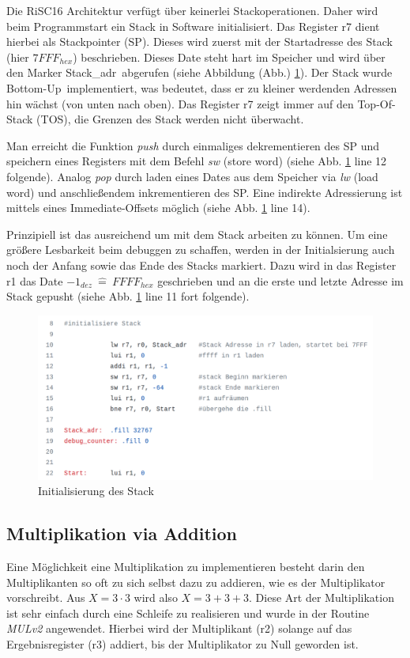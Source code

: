 \documentclass[fleqn, a4paper, 11pt]{article}       %
\begin{document}
Die RiSC16 Architektur verfügt über keinerlei Stackoperationen. Daher wird beim Programmstart ein Stack in Software initialisiert. Das Register r7 dient hierbei als Stackpointer (SP). Dieses wird zuerst mit der Startadresse des Stack (hier $7FFF_{hex}$) beschrieben. Dieses Date steht hart im Speicher und wird über den Marker \glqq Stack\_adr\grqq \ abgerufen (siehe  Abbildung (Abb.) \ref{fig:Stack}).
Der Stack wurde  \glqq Bottom-Up\grqq \ implementiert, was bedeutet, dass er zu kleiner werdenden Adressen hin wächst (von unten nach oben). Das Register r7 zeigt immer auf den Top-Of-Stack (TOS), die Grenzen des Stack werden nicht überwacht.

Man erreicht die Funktion \emph{push}  durch einmaliges dekrementieren des SP und speichern eines Registers mit dem Befehl \emph{sw} (store word) (siehe Abb. \ref{fig:Stack} line 12 folgende). Analog \emph{pop} durch laden eines Dates aus dem Speicher via \emph{lw} (load word) und anschließendem inkrementieren des SP. Eine indirekte Adressierung ist mittels eines Immediate-Offsets möglich (siehe Abb. \ref{fig:Stack} line 14).

Prinzipiell ist das ausreichend um mit dem Stack arbeiten zu können. Um eine größere Lesbarkeit beim debuggen zu schaffen, werden in der Initialsierung auch noch der Anfang sowie das Ende des Stacks markiert. Dazu wird in das Register r1 das Date $-1_{dez}\ \widehat{=}\ FFFF_{hex}$ geschrieben und an die erste und letzte Adresse im Stack gepusht (siehe Abb. \ref{fig:Stack} line 11 fort folgende).

\begin{figure}[h]
    \includegraphics[width =1\textwidth]{Stack_init.png}
\caption{Initialisierung des Stack}
\label{fig:Stack}
\end{figure}



\subsection{Multiplikation via Addition}
Eine Möglichkeit eine Multiplikation zu implementieren besteht darin den Multiplikanten so oft zu sich selbst dazu zu addieren, wie es der Multiplikator vorschreibt. Aus $X = 3 \cdot 3$ wird also $X = 3+3+3$. Diese Art der Multiplikation ist sehr einfach durch eine Schleife zu realisieren und wurde in der Routine \emph{MULv2} angewendet. Hierbei wird der Multiplikant (r2) solange auf das Ergebnisregister (r3) addiert, bis der Multiplikator zu Null geworden ist.
\end{document}
